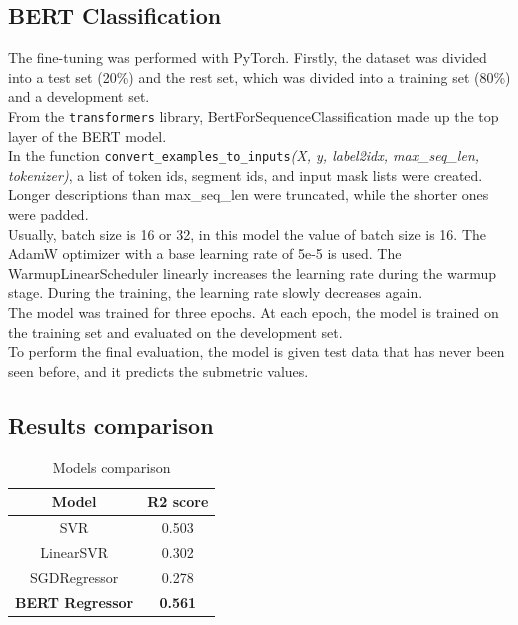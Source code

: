 \documentclass[times, utf8, zavrsni, english]{fer}
\begin{document}
\subsection{BERT Classification}
The fine-tuning was performed with PyTorch.
Firstly, the dataset was divided into a test set (20\%) and the rest set, which was divided into a training set (80\%) and a development set.\\
From the \texttt{transformers} library, BertForSequenceClassification made up the top layer of the BERT model.\\
In the function \texttt{convert\_examples\_to\_inputs}\textit{(X, y, label2idx, max\_seq\_len, tokenizer)}, a list of token ids, segment ids, and input mask lists were created. Longer descriptions than max\_seq\_len were truncated, while the shorter ones were padded. \\
Usually, batch size is 16 or 32, in this model the value of batch size is 16.
The AdamW optimizer with a base learning rate of 5e-5  is used. The WarmupLinearScheduler linearly increases the learning rate during the warmup stage. During the training, the learning rate slowly decreases again.\\
The model was trained for three epochs.
At each epoch, the model is trained on the training set and evaluated on the development set. \\
To perform the final evaluation, the model is given test data that has never been seen before, and it predicts the submetric values.

\subsection{Results comparison}
\begin{table}[h!]
	\centering
	\begin{tabular}{|| c | c ||} 
		\hline
		Model & R2 score \\ [0.5ex] 
		\hline\hline
		SVR & 0.503  \\ \hline
		LinearSVR & 0.302 \\ \hline
		SGDRegressor & 0.278 \\ \hline
		\textbf{BERT Regressor} & \textbf{0.561} \\ 
		
		\hline
	\end{tabular}
	\caption{Models comparison}
	\label{table:10}
\end{table}
\end{document}
